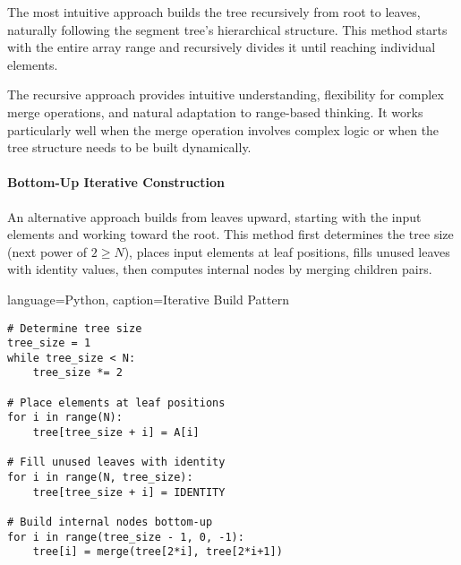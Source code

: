 The most intuitive approach builds the tree recursively from root to leaves, naturally following the segment tree's hierarchical structure. This method starts with the entire array range and recursively divides it until reaching individual elements.


\begin{algorithm}[H]
\caption{Recursive Segment Tree Build}
\end{algorithm}

The recursive approach provides intuitive understanding, flexibility for complex merge operations, and natural adaptation to range-based thinking. It works particularly well when the merge operation involves complex logic or when the tree structure needs to be built dynamically.

\paragraph{Bottom-Up Iterative Construction}

An alternative approach builds from leaves upward, starting with the input elements and working toward the root. This method first determines the tree size (next power of $2 \geq N$), places input elements at leaf positions, fills unused leaves with identity values, then computes internal nodes by merging children pairs.

\begin{marginlisting}[0pt]{language=Python, caption=Iterative Build Pattern}
\begin{lstlisting}
# Determine tree size
tree_size = 1
while tree_size < N:
    tree_size *= 2

# Place elements at leaf positions
for i in range(N):
    tree[tree_size + i] = A[i]

# Fill unused leaves with identity
for i in range(N, tree_size):
    tree[tree_size + i] = IDENTITY

# Build internal nodes bottom-up
for i in range(tree_size - 1, 0, -1):
    tree[i] = merge(tree[2*i], tree[2*i+1])
\end{lstlisting}
\end{marginlisting}

